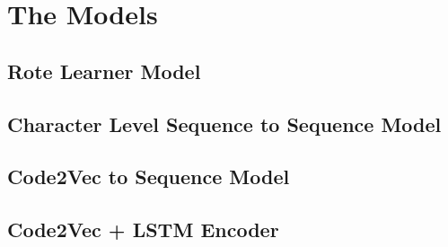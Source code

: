 \chapter{The Models}
\label{the_models}

\section{Rote Learner Model} %
\label{sec:rote_learner_model}


\section{Character Level Sequence to Sequence Model} %
\label{sec:character_level_sequence_to_sequence}


\section{Code2Vec to Sequence Model} %
\label{sec:code2vec_to_sequence_model}


\section{Code2Vec + LSTM Encoder} %
\label{sub:code2vec_sequence_to_sequence}

